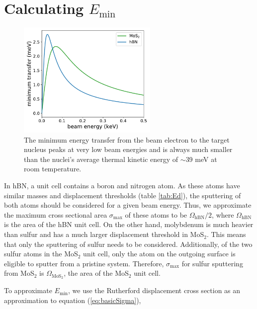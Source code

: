 \documentclass{article}
\begin{document}
\section{Calculating $E_\text{min}$}
\label{app:Emin}

\begin{figure}[H]
  \centering
  \includegraphics[width=0.6\textwidth]{figS5.pdf}
  \caption{
    The minimum energy transfer from the beam electron to the target nucleus
    peaks at very low beam energies and is always much smaller than the
    nuclei's average thermal kinetic energy of $\sim$39 meV at room
    temperature. 
  }
  \label{fig:Emin}
\end{figure}

In hBN, a unit cell contains a boron and nitrogen atom.
As these atoms have similar masses and displacement thresholds (table
\ref{tab:Ed}), the sputtering of both atoms should be considered for a given
beam energy.
Thus, we approximate the maximum cross sectional area $\sigma_\text{max}$ of
these atoms to be $\Omega_\text{hBN}/2$, where $\Omega_\text{hBN}$ is the area
of the hBN unit cell.
On the other hand, molybdenum is much heavier than sulfur and has a much larger
displacement threshold in MoS$_2$.\cite{Komsa2012}  
This means that only the sputtering of sulfur needs to be considered.
Additionally, of the two sulfur atoms in the MoS$_2$ unit cell, only the atom
on the outgoing surface is eligible to sputter from a pristine system.
\cite{Komsa2012}
Therefore, $\sigma_\text{max}$ for sulfur sputtering from MoS$_2$ is
$\Omega_\text{MoS$_2$}$, the area of the MoS$_2$ unit cell.

To approximate $E_\text{min}$, we use the Rutherford displacement cross section
\cite{Thornton2004, Sakurai2011, Yoshimura2018} as an approximation to equation
(\ref{eq:basicSigma}),
\end{document}
